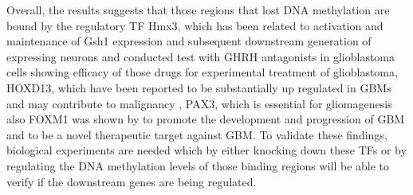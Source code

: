Overall, the results suggests that those regions that lost DNA methylation are bound by the regulatory TF Hmx3,
which  has been related to activation and maintenance of Gsh1 expression and subsequent downstream generation of  expressing neurons \cite{morales2014regionalized} and  conducted test with GHRH antagonists in glioblastoma cells showing efficacy of those drugs for experimental treatment of glioblastoma, HOXD13, which have been reported to be substantially up regulated in GBMs and may contribute to malignancy \cite{lee2015identification}, PAX3, which is essential for gliomagenesis \cite{xia2013pax3} also FOXM1  was shown by  to  promote the development and progression of GBM  and to be a novel therapeutic target against GBM.
To validate these findings, biological experiments are needed which by either knocking down these TFs or by regulating the DNA methylation levels of those binding regions will be able to verify if the downstream genes are being regulated.
